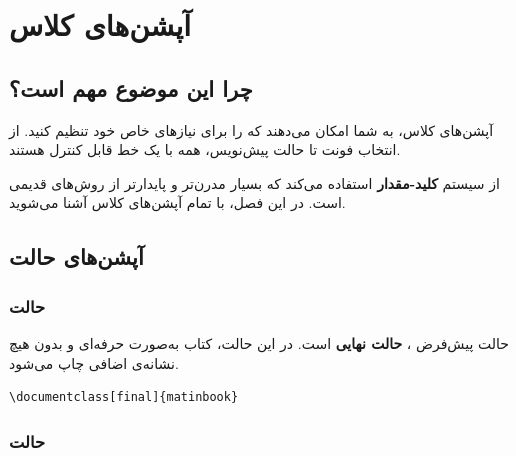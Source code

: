 
\chapter{آپشن‌های کلاس}
\label{chap:options}

\section{چرا این موضوع مهم است؟}
\label{sec:options-why}

آپشن‌های کلاس، به شما امکان می‌دهند که
 را برای نیازهای خاص خود تنظیم
کنید. از انتخاب فونت تا حالت پیش‌نویس، همه
با یک خط  قابل کنترل
هستند.

 از سیستم \textbf{کلید-مقدار}
 استفاده می‌کند که بسیار
مدرن‌تر و پایدارتر از روش‌های قدیمی است.
در این فصل، با تمام آپشن‌های کلاس آشنا
می‌شوید.


\section{آپشن‌های حالت}
\label{sec:options-mode}

\subsection{حالت }
\label{sec:options-final}

حالت پیش‌فرض ، \textbf{حالت
نهایی} است. در این حالت، کتاب به‌صورت
حرفه‌ای و بدون هیچ نشانه‌ی اضافی چاپ
می‌شود.

\begin{latin}
\begin{verbatim}
\documentclass[final]{matinbook}
\end{verbatim}
\end{latin}


\subsection{حالت }
\label{sec:options-draft}

